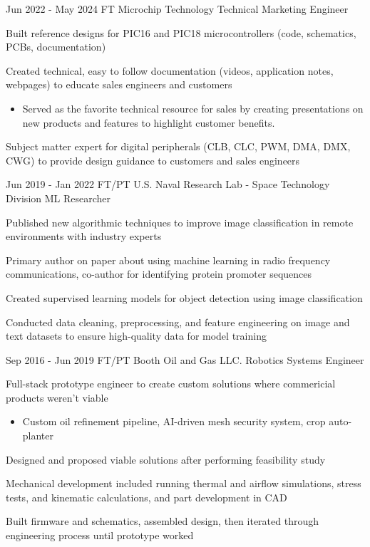\documentclass[
	12pt, %
]{FreemanCV}
\begin{document}
\jobentry
	{Jun 2022 - May 2024} %
	{FT} %
	{Microchip Technology} %
	{Technical Marketing Engineer} %
	{ %
		\item Built reference designs for PIC16 and PIC18 microcontrollers (code, schematics, PCBs, documentation)
		\item Created technical, easy to follow documentation (videos, application notes, webpages) to educate sales engineers and customers 
		\begin{itemize}[topsep=-10pt]
			\item Served as the favorite technical resource for sales by creating presentations on new products and features to highlight customer benefits.
			\end{itemize}
		\item Subject matter expert for digital peripherals (CLB, CLC, PWM, DMA, DMX, CWG) to provide design guidance to customers and sales engineers
	} 


\jobentry
	{Jun 2019 - Jan 2022} %
	{FT/PT} %
	{U.S. Naval Research Lab - Space Technology Division} %
	{ML Researcher} %
	{ %
		\item Published new algorithmic techniques to improve image classification in remote environments with industry experts
		\item Primary author on paper about using machine learning in radio frequency communications, co-author for identifying protein promoter sequences
		\item Created supervised learning models for object detection using image classification
		\item Conducted data cleaning, preprocessing, and feature engineering on image and text datasets to ensure high-quality data for model training
	} 
	

	
\jobentry
{Sep 2016 - Jun 2019} %
{FT/PT} %
{Booth Oil and Gas LLC.} %
{Robotics Systems Engineer} %
{ %
	\item Full-stack prototype engineer to create custom solutions where commericial products weren't viable
	\begin{itemize}[topsep=-10pt]
		\item Custom oil refinement pipeline, AI-driven mesh security system, crop auto-planter
	\end{itemize}
	\item Designed and proposed viable solutions after performing feasibility study
	\item Mechanical development included running thermal and airflow simulations, stress tests, and kinematic calculations, and part development in CAD
	\item Built firmware and schematics, assembled design, then iterated through engineering process until prototype worked
}
\end{document}

